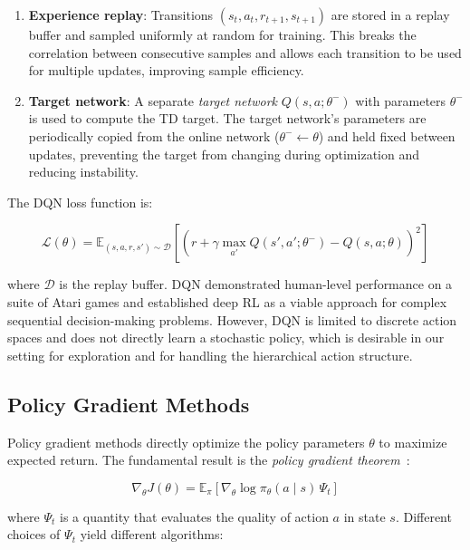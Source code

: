 \begin{enumerate}
    \item \textbf{Experience replay}: Transitions $(s_t, a_t, r_{t+1}, s_{t+1})$ are stored in a replay buffer and sampled uniformly at random for training. This breaks the correlation between consecutive samples and allows each transition to be used for multiple updates, improving sample efficiency.

    \item \textbf{Target network}: A separate \textit{target network} $Q(s, a; \theta^-)$ with parameters $\theta^-$ is used to compute the TD target. The target network's parameters are periodically copied from the online network ($\theta^- \leftarrow \theta$) and held fixed between updates, preventing the target from changing during optimization and reducing instability.
\end{enumerate}

The DQN loss function is:

\begin{equation}
    \mathcal{L}(\theta) = \mathbb{E}_{(s, a, r, s') \sim \mathcal{D}}\left[ \left( r + \gamma \max_{a'} Q(s', a'; \theta^-) - Q(s, a; \theta) \right)^2 \right]
\end{equation}

where $\mathcal{D}$ is the replay buffer. DQN demonstrated human-level performance on a suite of Atari games and established deep RL as a viable approach for complex sequential decision-making problems. However, DQN is limited to discrete action spaces and does not directly learn a stochastic policy, which is desirable in our setting for exploration and for handling the hierarchical action structure.

\subsection{Policy Gradient Methods}

Policy gradient methods directly optimize the policy parameters $\theta$ to maximize expected return. The fundamental result is the \textit{policy gradient theorem}~\cite{sutton1999policy}:

\begin{equation}
    \nabla_\theta J(\theta) = \mathbb{E}_\pi \left[ \nabla_\theta \log \pi_\theta(a \mid s) \, \Psi_t \right]
\end{equation}

where $\Psi_t$ is a quantity that evaluates the quality of action $a$ in state $s$. Different choices of $\Psi_t$ yield different algorithms:

